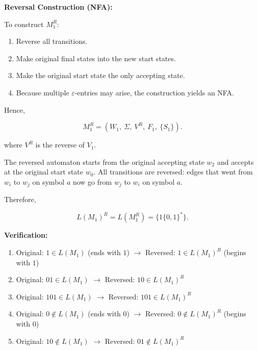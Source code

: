 \documentclass[12pt,a4paper,openany]{article}
\begin{document}
\textbf{Reversal Construction (NFA):}

To construct $M_1^R$:

\begin{enumerate}
    \item Reverse all transitions.
    \item Make original final states into the new start states.
    \item Make the original start state the only accepting state.
    \item Because multiple $\varepsilon$-entries may arise, the construction yields an NFA.
\end{enumerate}

Hence,

\[
M_1^R = (W_1,\ \Sigma,\ V^R,\ F_1,\ \{S_1\}).
\]

where $V^R$ is the reverse of $V_1$.

\begin{center}
\end{center}

The reversed automaton starts from the original accepting state $w_2$ and accepts at the original start state $w_0$. All transitions are reversed: edges that went from $w_i$ to $w_j$ on symbol $a$ now go from $w_j$ to $w_i$ on symbol $a$.

Therefore,

\[
L(M_1)^R = L(M_1^R) = \{1\{0,1\}^*\}.
\]

\textbf{Verification:}

\begin{enumerate}
    \item Original: $1 \in L(M_1)$ (ends with $1$) $\to$ Reversed: $1 \in L(M_1)^R$ (begins with $1$) 
    \item Original: $01 \in L(M_1)$ $\to$ Reversed: $10 \in L(M_1)^R$ 
    \item Original: $101 \in L(M_1)$ $\to$ Reversed: $101 \in L(M_1)^R$ 
    \item Original: $0 \notin L(M_1)$ (ends with $0$) $\to$ Reversed: $0 \notin L(M_1)^R$ (begins with $0$) 
    \item Original: $10 \notin L(M_1)$ $\to$ Reversed: $01 \notin L(M_1)^R$ 
\end{enumerate}
\end{document}
